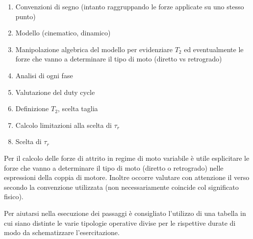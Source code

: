 \begin{enumerate}[label=\roman*.]
    \item Convenzioni di segno (intanto raggruppando le forze applicate su uno stesso punto)
    \item Modello (cinematico, dinamico)
    \item Manipolazione algebrica del modello per evidenziare $T_2$ ed eventualmente le forze che vanno a determinare il tipo di moto (diretto vs retrogrado)
    \item Analisi di ogni fase
    \item Valutazione del duty cycle
    \item Definizione $T_2$, scelta taglia
    \item Calcolo limitazioni alla scelta di $\tau_r$
    \item Scelta di $\tau_r$
\end{enumerate}

Per il calcolo delle forze di attrito in regime di moto variabile è utile esplicitare le forze che vanno a determinare il tipo di moto (diretto o retrogrado) nelle espressioni della coppia di motore.
Inoltre occorre valutare con attenzione il verso secondo la convenzione utilizzata (non necessariamente coincide col significato fisico).

Per aiutarsi nella esecuzione dei passaggi è consigliato l'utilizzo di una tabella in cui siano distinte le varie tipologie operative divise per le rispettive durate di modo da schematizzare l'esercitazione.

